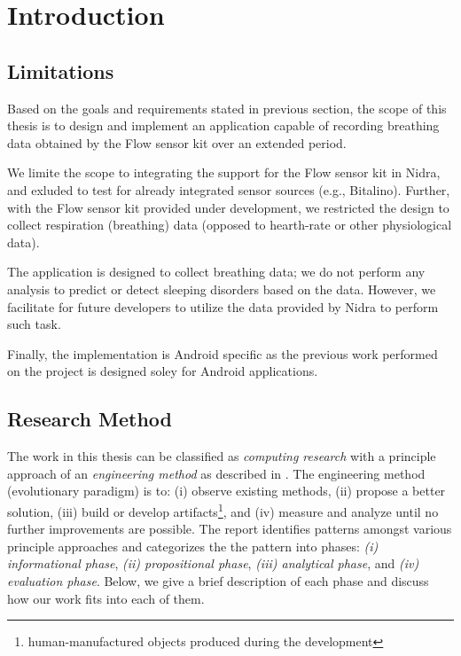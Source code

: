 \chapter{Introduction}\label{introduction}




\section{Limitations}
Based on the goals and requirements stated in previous section, the scope of this thesis is to design and implement an application capable of recording breathing data obtained by the Flow sensor kit over an extended period. 

We limite the scope to integrating the support for the Flow sensor kit in Nidra, and exluded to test for already integrated sensor sources (e.g., Bitalino). Further, with the Flow sensor kit provided under development, we restricted the design to collect respiration (breathing) data (opposed to hearth-rate or other physiological data).

The application is designed to collect breathing data; we do not perform any analysis to predict or detect sleeping disorders based on the data. However, we facilitate for future developers to utilize the data provided by Nidra to perform such task.

Finally, the implementation is Android specific as the previous work performed on the project is designed soley for Android applications. 

\section{Research Method}
The work in this thesis can be classified as \textit{computing research} with a principle approach of an \textit{engineering method} as described in \cite{Glass_1995}. The engineering method (evolutionary paradigm) is to: (i) observe existing methods, (ii) propose a better solution, (iii)  build or develop artifacts\footnote{human-manufactured objects produced during the development}, and (iv) measure and analyze until no further improvements are possible. The report identifies patterns amongst various principle approaches and categorizes the the pattern into phases: \textit{(i) informational phase}, \textit{(ii) propositional phase}, \textit{(iii) analytical phase}, and \textit{(iv) evaluation phase}. Below, we give a brief description of each phase and discuss how our work fits into each of them. 

